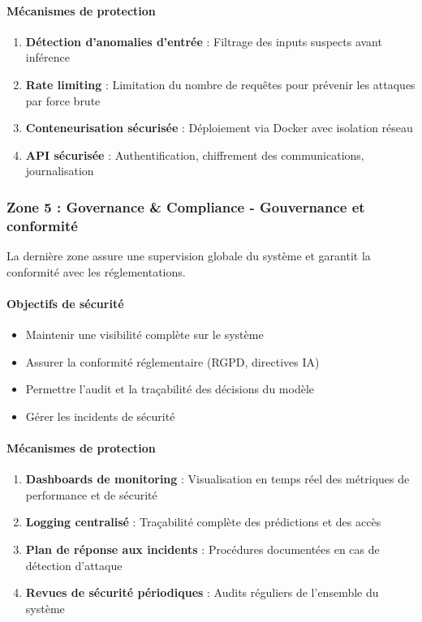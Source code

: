 \paragraph{Mécanismes de protection}
\begin{enumerate}
    \item \textbf{Détection d'anomalies d'entrée} : Filtrage des inputs suspects avant inférence
    \item \textbf{Rate limiting} : Limitation du nombre de requêtes pour prévenir les attaques par force brute
    \item \textbf{Conteneurisation sécurisée} : Déploiement via Docker avec isolation réseau
    \item \textbf{API sécurisée} : Authentification, chiffrement des communications, journalisation
\end{enumerate}

\subsubsection{Zone 5 : Governance \& Compliance - Gouvernance et conformité}

La dernière zone assure une supervision globale du système et garantit la conformité avec les réglementations.

\paragraph{Objectifs de sécurité}
\begin{itemize}
    \item Maintenir une visibilité complète sur le système
    \item Assurer la conformité réglementaire (RGPD, directives IA)
    \item Permettre l'audit et la traçabilité des décisions du modèle
    \item Gérer les incidents de sécurité
\end{itemize}

\paragraph{Mécanismes de protection}
\begin{enumerate}
    \item \textbf{Dashboards de monitoring} : Visualisation en temps réel des métriques de performance et de sécurité
    \item \textbf{Logging centralisé} : Traçabilité complète des prédictions et des accès
    \item \textbf{Plan de réponse aux incidents} : Procédures documentées en cas de détection d'attaque
    \item \textbf{Revues de sécurité périodiques} : Audits réguliers de l'ensemble du système
\end{enumerate}


